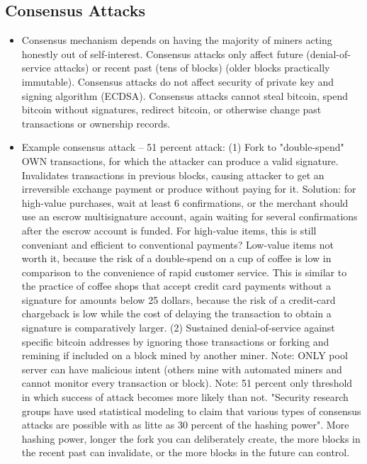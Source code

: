 \documentclass[english, 11pt]{article}
\begin{document}
\subsection{Consensus Attacks}
\begin{itemize}
    \item Consensus mechanism depends on having the majority of miners acting honestly out of self-interest. Consensus attacks only affect future (denial-of-service attacks) or recent past (tens of blocks) (older blocks practically immutable). Consensus attacks do not affect security of private key and signing algorithm (ECDSA). Consensus attacks cannot steal bitcoin, spend bitcoin without signatures, redirect bitcoin, or otherwise change past transactions or ownership records.
    \item Example consensus attack -- 51 percent attack: (1) Fork to "double-spend" OWN transactions, for which the attacker can produce a valid signature. Invalidates transactions in previous blocks, causing attacker to get an irreversible exchange payment or produce without paying for it. Solution: for high-value purchases, wait at least 6 confirmations, or the merchant should use an escrow multisignature account, again waiting for several confirmations after the escrow account is funded. For high-value items, this is still conveniant and efficient to conventional payments? Low-value items not worth it, because the risk of a double-spend on a cup of coffee is low in comparison to the convenience of rapid customer service. This is similar to the practice of coffee shops that accept credit card payments without a signature for amounts below 25 dollars, because the risk of a credit-card chargeback is low while the cost of delaying the transaction to obtain a signature is comparatively larger. (2) Sustained denial-of-service against specific bitcoin addresses by ignoring those transactions or forking and remining if included on a block mined by another miner. Note: ONLY pool server can have malicious intent (others mine with automated miners and cannot monitor every transaction or block). Note: 51 percent only threshold in which success of attack becomes more likely than not. "Security research groups have used statistical modeling to claim that various types of consensus attacks are possible with as litte as 30 percent of the hashing power". More hashing power, longer the fork you can deliberately create, the more blocks in the recent past can invalidate, or the more blocks in the future can control.

\end{itemize}
\end{document}
